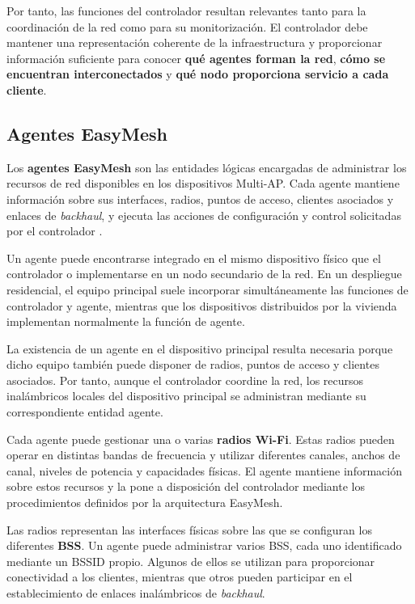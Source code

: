 Por tanto, las funciones del controlador resultan relevantes tanto para
la coordinación de la red como para su monitorización. El controlador
debe mantener una representación coherente de la infraestructura y
proporcionar información suficiente para conocer
\textbf{qué agentes forman la red}, \textbf{cómo se encuentran
interconectados} y \textbf{qué nodo proporciona servicio a cada cliente}.

\subsection{Agentes EasyMesh}
\label{subsec:agentes-easymesh}

Los \textbf{agentes EasyMesh} son las entidades lógicas encargadas de
administrar los recursos de red disponibles en los dispositivos
Multi-AP. Cada agente mantiene información sobre sus interfaces, radios,
puntos de acceso, clientes asociados y enlaces de
\textit{backhaul}, y ejecuta las acciones de configuración y control
solicitadas por el controlador \cite{wifi_alliance_easymesh}.

Un agente puede encontrarse integrado en el mismo dispositivo físico que
el controlador o implementarse en un nodo secundario de la red. En un
despliegue residencial, el equipo principal suele incorporar
simultáneamente las funciones de controlador y agente, mientras que los
dispositivos distribuidos por la vivienda implementan normalmente la
función de agente.

La existencia de un agente en el dispositivo principal resulta necesaria
porque dicho equipo también puede disponer de radios, puntos de acceso y
clientes asociados. Por tanto, aunque el controlador coordine la red,
los recursos inalámbricos locales del dispositivo principal se
administran mediante su correspondiente entidad agente.

Cada agente puede gestionar una o varias \textbf{radios Wi-Fi}. Estas
radios pueden operar en distintas bandas de frecuencia y utilizar
diferentes canales, anchos de canal, niveles de potencia y capacidades
físicas. El agente mantiene información sobre estos recursos y la pone a
disposición del controlador mediante los procedimientos definidos por la
arquitectura EasyMesh.

Las radios representan las interfaces físicas sobre las que se configuran
los diferentes \textbf{BSS}. Un agente puede administrar varios BSS,
cada uno identificado mediante un BSSID propio. Algunos de ellos se
utilizan para proporcionar conectividad a los clientes, mientras que
otros pueden participar en el establecimiento de enlaces inalámbricos de
\textit{backhaul}.

